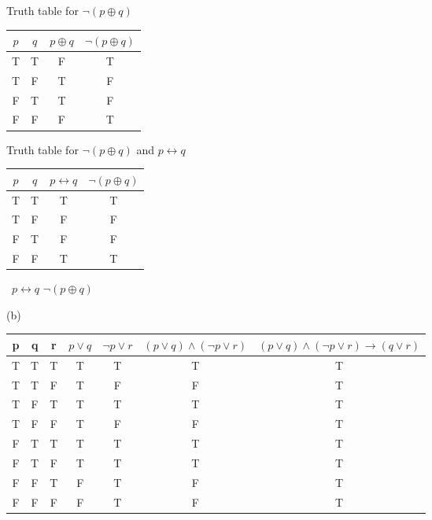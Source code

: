 \documentclass[a4paper]{article}
\begin{document}
\begin{enumerate}
\begin{center}
            \vspace{0in}


             Truth table for $\neg \left(p \oplus q\right)$ \\
            \begin{tabular}{|c|c|c|c|}
                \hline
                $p$ & $q$ & $p \oplus q$ & $\neg \left(p \oplus q\right)$ \\ \hline
                T & T & F & T \\ \hline
                T & F & T & F \\ \hline
                F & T & T & F \\ \hline
                F & F & F & T \\ \hline
            \end{tabular}
            \vspace{0in}


Truth table for $\neg \left(p \oplus q\right)$ and $p \leftrightarrow q$ \\
            \begin{tabular}{|c|c|c|c|}
                \hline
                $p$ & $q$ & $p \leftrightarrow q$ & $\neg \left(p \oplus q\right)$ \\ \hline
                T & T & T & T \\ \hline
                T & F & F & F \\ \hline
                F & T & F & F \\ \hline
                F & F & T & T \\ \hline
            \end{tabular}
        \end{center}

        \therefore \ $p \leftrightarrow q$ \equiv $\neg \left(p \oplus q\right)$
        
        \vspace{2in}

        (b)
 
 \begin{center}
           \begin{tabular}{|c|c|c|c|c|c|c|}
           \hline
p & q & r & $p \lor q$ & $\neg p \lor r$ & $(p \lor q) \land (\neg p \lor r)$ & $(p \lor q) \land (\neg p \lor r) \rightarrow (q \lor r)$ \\
\hline
T & T & T & T & T & T & T \\ \hline
T & T & F & T & F & F & T \\ \hline
T & F & T & T & T & T & T \\ \hline
T & F & F & T & F & F & T \\ \hline
F & T & T & T & T & T & T \\ \hline
F & T & F & T & T & T & T \\ \hline
F & F & T & F & T & F & T \\ \hline
F & F & F & F & T & F & T \\ \hline
\end{tabular}


\end{center}
\end{enumerate}
\end{document}
